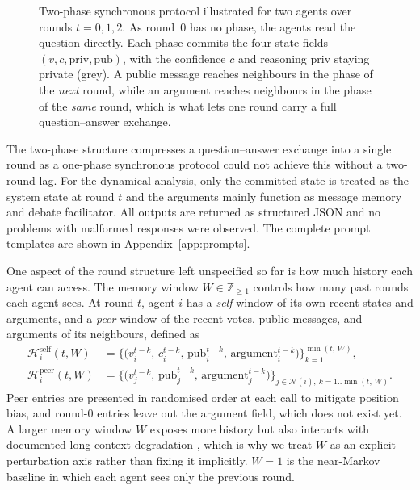 \begin{figure}[H]
\begin{tikzpicture}
\end{tikzpicture}
\caption[Two-phase synchronous debate protocol]{Two-phase synchronous protocol illustrated for two agents over rounds
$t{=}0,1,2$. As round~$0$ has no \arguephase{} phase, the agents read
the question directly. Each \updatephase{} phase commits the four state fields
$(v,c,\text{priv},\text{pub})$, with the confidence $c$ and reasoning $\text{priv}$
staying private (grey). A public message reaches neighbours in the \arguephase{} phase of the \emph{next}
round, while an \arguephase{} argument reaches neighbours in the \updatephase{} phase
of the \emph{same} round, which is what lets one round carry a full question--answer exchange.}
\label{fig:protocol}
\end{figure}

The two-phase structure compresses a question--answer exchange into a single
round as a one-phase synchronous protocol could not achieve this without a
two-round lag. For the dynamical analysis, only the committed \updatephase{} state is
treated as the system state at round $t$ and the arguments mainly function as message memory and debate facilitator. 
All outputs are returned as structured JSON and no problems with malformed responses were observed. 
The complete prompt templates are shown in Appendix~\ref{app:prompts}.

\label{sec:setup:protocol:memory}%
One aspect of the round structure left unspecified so far is how much history each
agent can access. The memory window $W \in \mathbb{Z}_{\geq 1}$ controls how many past rounds each agent sees. 
At round $t$, agent $i$ has a \emph{self} window of its
own recent states and arguments, and a \emph{peer} window of the recent
votes, public messages, and arguments of its neighbours, defined as
\begin{align}
  \mathcal{H}^{\text{self}}_i(t, W)
    &= \big\{\big(v_i^{t-k},\, c_i^{t-k},\, \text{pub}_i^{t-k},\, \text{argument}_i^{t-k}\big)\big\}_{k=1}^{\min(t,\,W)}, \\
  \mathcal{H}^{\text{peer}}_i(t, W)
    &= \big\{\big(v_j^{t-k},\, \text{pub}_j^{t-k},\, \text{argument}_j^{t-k}\big)\big\}_{j \in \mathcal{N}(i),\ k=1..\min(t,\,W)}.
\end{align}
Peer entries are presented in randomised order at each call to mitigate position
bias, and round-$0$ entries leave out the argument field, which does not exist yet. A larger memory window
$W$ exposes more history but also interacts with documented long-context
degradation \citep{liu2024lostmiddle}, which is why we treat $W$ as an explicit
perturbation axis rather than fixing it implicitly. $W = 1$ is the near-Markov
baseline in which each agent sees only the previous round.

